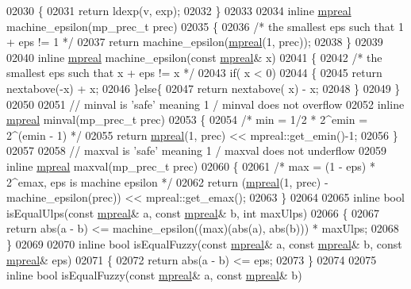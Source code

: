 \begin{DoxyCode}
{{02030 \{
02031     \textcolor{keywordflow}{return} ldexp(v, exp);
02032 \}
02033 
02034 \textcolor{keyword}{inline} \hyperlink{classmpfr_1_1mpreal}{mpreal} machine\_epsilon(mp\_prec\_t prec)
02035 \{
02036     \textcolor{comment}{/* the smallest eps such that 1 + eps != 1 */}
02037     \textcolor{keywordflow}{return} machine\_epsilon(\hyperlink{classmpfr_1_1mpreal}{mpreal}(1, prec));
02038 \}
02039 
02040 \textcolor{keyword}{inline} \hyperlink{classmpfr_1_1mpreal}{mpreal} machine\_epsilon(\textcolor{keyword}{const} \hyperlink{classmpfr_1_1mpreal}{mpreal}& x)
02041 \{
02042     \textcolor{comment}{/* the smallest eps such that x + eps != x */}
02043     \textcolor{keywordflow}{if}( x < 0)
02044     \{
02045         \textcolor{keywordflow}{return} nextabove(-x) + x;
02046     \}\textcolor{keywordflow}{else}\{
02047         \textcolor{keywordflow}{return} nextabove( x) - x;
02048     \}
02049 \}
02050 
02051 \textcolor{comment}{// minval is 'safe' meaning 1 / minval does not overflow}
02052 \textcolor{keyword}{inline} \hyperlink{classmpfr_1_1mpreal}{mpreal} minval(mp\_prec\_t prec)
02053 \{
02054     \textcolor{comment}{/* min = 1/2 * 2^emin = 2^(emin - 1) */}
02055     \textcolor{keywordflow}{return} \hyperlink{classmpfr_1_1mpreal}{mpreal}(1, prec) << mpreal::get\_emin()-1;
02056 \}
02057 
02058 \textcolor{comment}{// maxval is 'safe' meaning 1 / maxval does not underflow}
02059 \textcolor{keyword}{inline} \hyperlink{classmpfr_1_1mpreal}{mpreal} maxval(mp\_prec\_t prec)
02060 \{
02061     \textcolor{comment}{/* max = (1 - eps) * 2^emax, eps is machine epsilon */}
02062     \textcolor{keywordflow}{return} (\hyperlink{classmpfr_1_1mpreal}{mpreal}(1, prec) - machine\_epsilon(prec)) << mpreal::get\_emax();
02063 \}
02064 
02065 \textcolor{keyword}{inline} \textcolor{keywordtype}{bool} isEqualUlps(\textcolor{keyword}{const} \hyperlink{classmpfr_1_1mpreal}{mpreal}& a, \textcolor{keyword}{const} \hyperlink{classmpfr_1_1mpreal}{mpreal}& b, \textcolor{keywordtype}{int} maxUlps)
02066 \{
02067     \textcolor{keywordflow}{return} abs(a - b) <= machine\_epsilon((max)(abs(a), abs(b))) * maxUlps;
02068 \}
02069 
02070 \textcolor{keyword}{inline} \textcolor{keywordtype}{bool} isEqualFuzzy(\textcolor{keyword}{const} \hyperlink{classmpfr_1_1mpreal}{mpreal}& a, \textcolor{keyword}{const} \hyperlink{classmpfr_1_1mpreal}{mpreal}& b, \textcolor{keyword}{const} 
      \hyperlink{classmpfr_1_1mpreal}{mpreal}& eps)
02071 \{
02072     \textcolor{keywordflow}{return} abs(a - b) <= eps;
02073 \}
02074 
02075 \textcolor{keyword}{inline} \textcolor{keywordtype}{bool} isEqualFuzzy(\textcolor{keyword}{const} \hyperlink{classmpfr_1_1mpreal}{mpreal}& a, \textcolor{keyword}{const} \hyperlink{classmpfr_1_1mpreal}{mpreal}& b)
}}
\end{DoxyCode}
